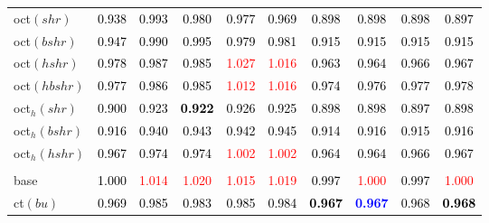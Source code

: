 \begin{tabular}[t]{l|ccccccccc}
oct$(shr)$ & \textcolor{black}{0.938} & \textcolor{black}{0.993} & \textcolor{black}{0.980} & \textcolor{black}{0.977} & \textcolor{black}{0.969} & \textcolor{black}{0.898} & \textcolor{black}{0.898} & \textcolor{black}{0.898} & \textcolor{black}{0.897}\\
oct$(bshr)$ & \textcolor{black}{0.947} & \textcolor{black}{0.990} & \textcolor{black}{0.995} & \textcolor{black}{0.979} & \textcolor{black}{0.981} & \textcolor{black}{0.915} & \textcolor{black}{0.915} & \textcolor{black}{0.915} & \textcolor{black}{0.915}\\
oct$(hshr)$ & \textcolor{black}{0.978} & \textcolor{black}{0.987} & \textcolor{black}{0.985} & \textcolor{red}{1.027} & \textcolor{red}{1.016} & \textcolor{black}{0.963} & \textcolor{black}{0.964} & \textcolor{black}{0.966} & \textcolor{black}{0.967}\\
oct$(hbshr)$ & \textcolor{black}{0.977} & \textcolor{black}{0.986} & \textcolor{black}{0.985} & \textcolor{red}{1.012} & \textcolor{red}{1.016} & \textcolor{black}{0.974} & \textcolor{black}{0.976} & \textcolor{black}{0.977} & \textcolor{black}{0.978}\\
oct$_h(shr)$ & \textcolor{black}{0.900} & \textcolor{black}{0.923} & \textcolor{black}{\textbf{0.922}} & \textcolor{black}{0.926} & \textcolor{black}{0.925} & \textcolor{black}{0.898} & \textcolor{black}{0.898} & \textcolor{black}{0.897} & \textcolor{black}{0.898}\\
oct$_h(bshr)$ & \textcolor{black}{0.916} & \textcolor{black}{0.940} & \textcolor{black}{0.943} & \textcolor{black}{0.942} & \textcolor{black}{0.945} & \textcolor{black}{0.914} & \textcolor{black}{0.916} & \textcolor{black}{0.915} & \textcolor{black}{0.916}\\
oct$_h(hshr)$ & \textcolor{black}{0.967} & \textcolor{black}{0.974} & \textcolor{black}{0.974} & \textcolor{red}{1.002} & \textcolor{red}{1.002} & \textcolor{black}{0.964} & \textcolor{black}{0.964} & \textcolor{black}{0.966} & \textcolor{black}{0.967}\\
\addlinespace[0.3em]
\multicolumn{10}{c}{\textbf{$k = 1$}}\\
base & \textcolor{black}{1.000} & \textcolor{red}{1.014} & \textcolor{red}{1.020} & \textcolor{red}{1.015} & \textcolor{red}{1.019} & \textcolor{black}{0.997} & \textcolor{red}{1.000} & \textcolor{black}{0.997} & \textcolor{red}{1.000}\\
ct$(bu)$ & \textcolor{black}{0.969} & \textcolor{black}{0.985} & \textcolor{black}{0.983} & \textcolor{black}{0.985} & \textcolor{black}{0.984} & \textcolor{black}{\textbf{0.967}} & \textcolor{blue}{\textbf{0.967}} & \textcolor{black}{0.968} & \textcolor{black}{\textbf{0.968}}\\

\end{tabular}
